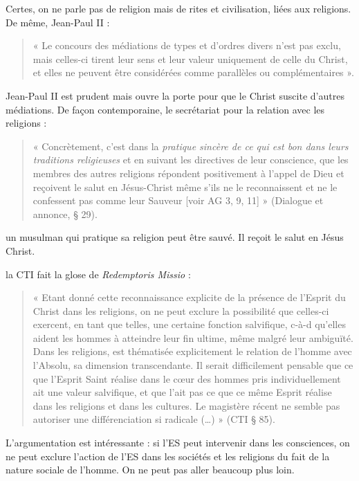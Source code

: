  Certes, on ne parle pas de religion mais de rites et civilisation, liées aux religions.
 De même, Jean-Paul II : 
 \begin{quote}
      « Le concours des médiations de types et d’ordres divers n’est pas exclu, mais celles-ci tirent leur sens et leur valeur uniquement de celle du Christ, et elles ne peuvent être considérées comme parallèles ou complémentaires ».  
 \end{quote}
 Jean-Paul II est prudent mais ouvre la porte pour que le Christ suscite d'autres médiations.
 De façon contemporaine, le secrétariat pour la relation avec les religions : 
 \begin{quote}
     « Concrètement, c’est dans la \textit{pratique sincère de ce qui est bon dans leurs traditions religieuses} et en suivant les directives de leur conscience, que les membres des autres religions répondent positivement à l’appel de Dieu et reçoivent le salut en Jésus-Christ même s’ils ne le reconnaissent et ne le confessent pas comme leur Sauveur [voir AG 3, 9, 11] » (Dialogue et annonce, § 29). 
 \end{quote}
 
 \begin{Ex}
 un musulman qui pratique sa religion peut être sauvé. Il reçoit le salut en Jésus Christ.
 \end{Ex}
 
 la CTI fait la glose de \textit{Redemptoris Missio} :
 \begin{quote}
     « Etant donné cette reconnaissance explicite de la présence de l’Esprit du Christ dans les religions, on ne peut exclure la possibilité que celles-ci exercent, en tant que telles, une certaine fonction salvifique, c-à-d qu’elles aident les hommes à atteindre leur fin ultime, même malgré leur ambiguïté. Dans les religions, est thématisée explicitement le relation de l’homme avec l’Absolu, sa dimension transcendante. Il serait difficilement pensable que ce que l’Esprit Saint réalise dans le cœur des hommes pris individuellement ait une valeur salvifique, et que l’ait pas ce que ce même Esprit réalise dans les religions et dans les cultures. Le magistère récent ne semble pas autoriser une différenciation si radicale (…) » (CTI §  85). 
 \end{quote}
 L'argumentation est intéressante : si l'ES peut intervenir dans les consciences, on ne peut exclure l'action de l'ES dans les sociétés et les religions du fait de la nature sociale de l'homme. On ne peut pas aller beaucoup plus loin.
 
